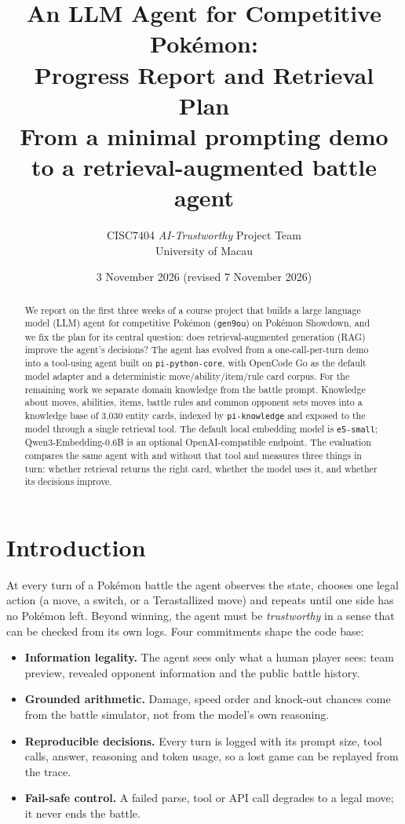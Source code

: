 \documentclass[11pt,a4paper]{article}
\title{\vspace{-1.2em}\textbf{An LLM Agent for Competitive Pok\'emon:}\\[0.1em]
\textbf{Progress Report and Retrieval Plan}\\[0.35em]
\large From a minimal prompting demo to a retrieval-augmented battle agent}
\author{CISC7404 \emph{AI-Trustworthy} Project Team\\University of Macau}
\date{3 November 2026 (revised 7 November 2026)}
\newcommand{\code}[1]{\texttt{#1}}
\begin{document}
\maketitle
\vspace{-2.2em}

\begin{abstract}
\noindent
We report on the first three weeks of a course project that builds a large language model (LLM) agent for
competitive Pok\'emon (\code{gen9ou}) on Pok\'emon Showdown, and we fix the plan for its central question:
does retrieval-augmented generation (RAG) improve the agent's decisions? The agent has evolved from a
one-call-per-turn demo into a tool-using agent built on \code{pi-python-core}, with OpenCode Go as the
default model adapter and a deterministic move/ability/item/rule card corpus. For the remaining work we
separate domain knowledge from the battle prompt. Knowledge about moves, abilities, items, battle rules and
common opponent sets moves into a knowledge base of 3{,}030 entity cards, indexed by \code{pi-knowledge}
and exposed to the model through a single retrieval tool. The default local embedding model is
\code{e5-small}; Qwen3-Embedding-0.6B is an optional OpenAI-compatible endpoint. The evaluation compares
the same agent with and without that tool and measures three things in turn: whether retrieval returns the
right card, whether the model uses it, and whether its decisions improve.
\end{abstract}

\section{Introduction}

At every turn of a Pok\'emon battle the agent observes the state, chooses one legal action (a move, a switch,
or a Terastallized move) and repeats until one side has no Pok\'emon left. Beyond winning, the agent must be
\emph{trustworthy} in a sense that can be checked from its own logs. Four commitments shape the code base:

\begin{itemize}
  \item \textbf{Information legality.} The agent sees only what a human player sees: team preview, revealed
        opponent information and the public battle history.
  \item \textbf{Grounded arithmetic.} Damage, speed order and knock-out chances come from the battle
        simulator, not from the model's own reasoning.
  \item \textbf{Reproducible decisions.} Every turn is logged with its prompt size, tool calls, answer,
        reasoning and token usage, so a lost game can be replayed from the trace.
  \item \textbf{Fail-safe control.} A failed parse, tool or API call degrades to a legal move; it never ends
        the battle.
\end{itemize}
\end{document}
